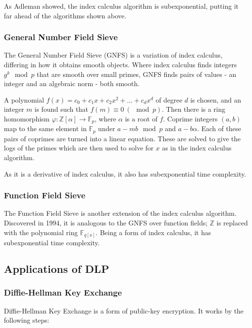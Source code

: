 \documentclass{article}
\begin{document}
As Adleman showed, the index calculus algorithm is subexponential, putting it far ahead of the algorithms shown above.

\subsubsection{General Number Field Sieve}

The General Number Field Sieve (GNFS) \cite{Lenstra1993The} is a variation of index calculus, differing in how it obtains smooth objects. Where index calculus finds integers $g^k \mod p$ that are smooth over small primes, GNFS finds pairs of values - an integer and an algebraic norm - both smooth.

A polynomial $f(x) = c_0+c_1x+c_2x^2+...+c_dx^d$ of degree $d$ is chosen, and an integer $m$ is found such that $f(m) \equiv 0 \ (\mod p)$. Then there is a ring homomorphism $\varphi: \mathbb{Z}[\alpha] \rightarrow \mathbb{F}_p$, where $\alpha$ is a root of $f$. Coprime integers $(a,b)$ map to the same element in $\mathbb{F}_p$ under $a - mb \mod p$ and $a-b\alpha$. Each of these pairs of coprimes are turned into a linear equation. These are solved to give the logs of the primes which are then used to solve for $x$ as in the index calculus algorithm.

As it is a derivative of index calculus, it also has subexponential time complexity.

\subsubsection{Function Field Sieve}

The Function Field Sieve \cite{Adleman1994The} is another extension of the index calculus algorithm. Discovered in 1994, it is analogous to the GNFS over function fields; $\mathbb{Z}$ is replaced with the polynomial ring $\mathbb{F}_{q[x]}$. Being a form of index calculus, it has subexponential time complexity.

\subsection{Applications of DLP}

\subsubsection{Diffie-Hellman Key Exchange}

Diffie-Hellman Key Exchange \cite{Diffie1976New} is a form of public-key encryption. It works by the following steps:
\end{document}
